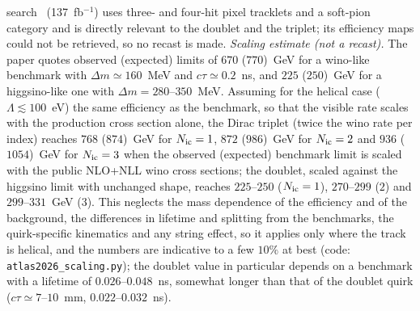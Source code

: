 \documentclass[prd,twocolumn,nofootinbib,superscriptaddress,amsmath,amssymb]{revtex4-2}
\begin{document}
search~\cite{ATLAS:DT2026} (137~fb$^{-1}$) uses three- and four-hit pixel tracklets and a soft-pion category and is directly relevant to the doublet and the triplet; its efficiency maps could not be retrieved, so no recast is made. \emph{Scaling estimate (not a recast).} The paper quotes observed (expected) limits of $670$ ($770$)~GeV for a wino-like benchmark with $\Delta m\simeq160$~MeV and $c\tau\simeq0.2$~ns, and $225$ ($250$)~GeV for a higgsino-like one with $\Delta m=280$--$350$~MeV. Assuming for the helical case ($\Lambda\lesssim100$~eV) the same efficiency as the benchmark, so that the visible rate scales with the production cross section alone, the Dirac triplet (twice the wino rate per index) reaches $768$ ($874$)~GeV for $N_{\rm ic}=1$, $872$ ($986$)~GeV for $N_{\rm ic}=2$ and $936$ ($1054$)~GeV for $N_{\rm ic}=3$ when the observed (expected) benchmark limit is scaled with the public NLO+NLL wino cross sections; the doublet, scaled against the higgsino limit with unchanged shape, reaches $225$--$250$ ($N_{\rm ic}=1$), $270$--$299$ ($2$) and $299$--$331$~GeV ($3$). This neglects the mass dependence of the efficiency and of the background, the differences in lifetime and splitting from the benchmarks, the quirk-specific kinematics and any string effect, so it applies only where the track is helical, and the numbers are indicative to a few $10\%$ at best (code: \texttt{atlas2026\_scaling.py}); the doublet value in particular depends on a benchmark with a lifetime of $0.026$--$0.048$~ns, somewhat longer than that of the doublet quirk ($c\tau\simeq7$--$10$~mm, $0.022$--$0.032$~ns).
\end{document}
